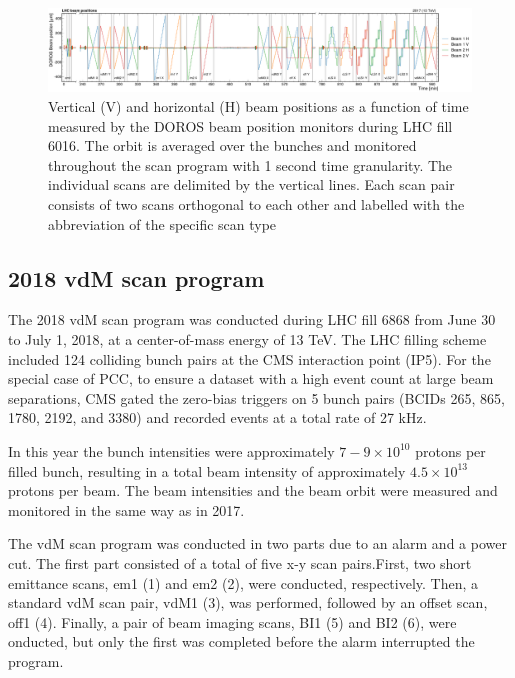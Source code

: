   \begin{figure}[h]
    \hspace{-.4cm}
    \includegraphics[scale=.17]{Chapter3/BeamPosition/doros_vs_time_6016.pdf}
    \caption[Beam Position in vdM scan 2017]{ Vertical (V) and horizontal (H) beam positions as a function of time measured by the DOROS beam position monitors during LHC fill 6016. The orbit is averaged over the bunches and monitored throughout the scan program with 1 second time granularity. The individual scans are delimited by the vertical lines. Each scan pair consists of two scans orthogonal to each other and labelled with the abbreviation of the specific scan type}
    \label{BeamPosition_2017}
  \end{figure}


\subsection{2018 vdM scan program}
\label{2018 vdM scan program}

The 2018 vdM scan program was conducted during LHC fill 6868 from June 30 to July 1, 2018, at a center-of-mass energy of 13 TeV. The LHC filling scheme included 124 colliding bunch pairs at the CMS interaction point (IP5). For the special case of PCC, to ensure a dataset with a high event count at large beam separations, CMS gated the zero-bias triggers on 5 bunch pairs (BCIDs 265, 865, 1780, 2192, and 3380) and recorded events at a total rate of 27 kHz.  

In this year the bunch intensities were approximately \(7-9 \times 10^{10}\) protons per filled bunch, resulting in a total beam intensity of approximately \(4.5 \times 10^{13}\) protons per beam. The beam intensities and the beam orbit were measured and monitored in the same way as in 2017.

The vdM scan program was conducted in two parts due to an alarm and a power cut. The first part consisted of a total of five x-y scan pairs.First, two short emittance scans, em1 (1) and em2 (2), were conducted, respectively. Then, a standard vdM scan pair, vdM1 (3), was performed, followed by an offset scan, off1 (4). Finally, a pair of beam imaging scans, BI1 (5) and BI2 (6), were onducted, but only the first was completed before the alarm interrupted the program.  

